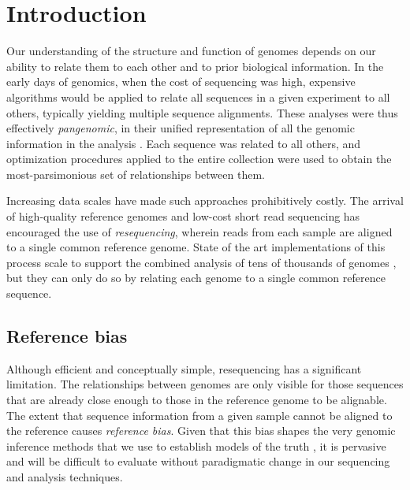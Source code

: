 \section{Introduction}

Our understanding of the structure and function of genomes depends on our ability to relate them to each other and to prior biological information.
In the early days of genomics, when the cost of sequencing was high, expensive algorithms would be applied to relate all sequences in a given experiment to all others, typically yielding multiple sequence alignments.
These analyses were thus effectively \emph{pangenomic}, in their unified representation of all the genomic information in the analysis \cite{computational2016computational}.
Each sequence was related to all others, and optimization procedures applied to the entire collection were used to obtain the most-parsimonious set of relationships between them.

Increasing data scales have made such approaches prohibitively costly.
The arrival of high-quality reference genomes and low-cost short read sequencing has encouraged the use of \emph{resequencing}, wherein reads from each sample are aligned to a single common reference genome.
State of the art implementations of this process scale to support the combined analysis of tens of thousands of genomes \cite{Poplin_2017}, but they can only do so by relating each genome to a single common reference sequence.

\subsection{Reference bias}

Although efficient and conceptually simple, resequencing has a significant limitation.
The relationships between genomes are only visible for those sequences that are already close enough to those in the reference genome to be alignable.
The extent that sequence information from a given sample cannot be aligned to the reference causes \emph{reference bias}.
Given that this bias shapes the very genomic inference methods that we use to establish models of the truth \cite{zook2014integrating}, it is pervasive and will be difficult to evaluate without paradigmatic change in our sequencing and analysis techniques.


